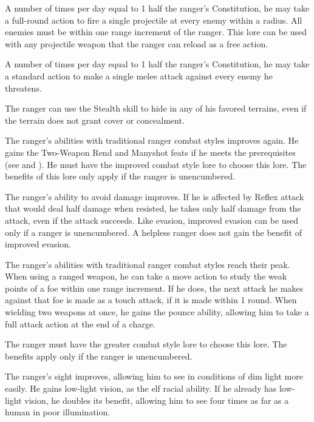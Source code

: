  A number of times per day equal to 1 \add half the ranger's Constitution, he may take a full-round action to fire a single projectile at every enemy within a \areamed radius. All enemies must be within one range increment of the ranger. This lore can be used with any projectile weapon that the ranger can reload as a free action.

 A number of times per day equal to 1 \add half the ranger's Constitution, he may take a standard action to make a single melee attack against every enemy he threatens.

\label{Camouflage} The ranger can use the Stealth skill to hide in any of his favored terrains, even if the terrain does not grant cover or concealment.

 The ranger's abilities with traditional ranger combat styles improves again. He gains the Two-Weapon Rend and Manyshot feats if he meets the prerequisites (see  and ). He must have the improved combat style lore to choose this lore. The benefits of this lore only apply if the ranger is unencumbered.

 The ranger's ability to avoid damage improves. If he is affected by Reflex attack that would deal half damage when resisted, he takes only half damage from the attack, even if the attack succeeds. Like evasion, improved evasion can be used only if a ranger is unencumbered. A helpless ranger does not gain the benefit of improved evasion.

 The ranger's abilities with traditional ranger combat styles reach their peak. When using a ranged weapon, he can take a move action to study the weak points of a foe within one range increment. If he does, the next attack he makes against that foe is made as a touch attack, if it is made within 1 round. When wielding two weapons at once, he gains the pounce ability, allowing him to take a full attack action at the end of a charge.

The ranger must have the greater combat style lore to choose this lore. The benefits apply only if the ranger is unencumbered.

 The ranger's sight improves, allowing him to see in conditions of dim light more easily. He gains low-light vision, as the elf racial ability. If he already has low-light vision, he doubles its benefit, allowing him to see four times as far as a human in poor illumination.

